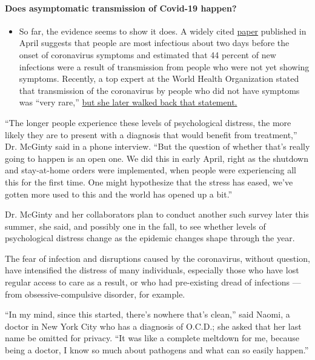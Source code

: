 \begin{itemize}
{  \paragraph{Does asymptomatic transmission of Covid-19
  happen?}\label{does-asymptomatic-transmission-of-covid-19-happen}}

  \begin{itemize}
  \tightlist
  \item
    So far, the evidence seems to show it does. A widely cited
    \href{https://www.nature.com/articles/s41591-020-0869-5}{paper}
    published in April suggests that people are most infectious about
    two days before the onset of coronavirus symptoms and estimated that
    44 percent of new infections were a result of transmission from
    people who were not yet showing symptoms. Recently, a top expert at
    the World Health Organization stated that transmission of the
    coronavirus by people who did not have symptoms was ``very rare,''
    \href{https://www.nytimes.com/2020/06/09/world/coronavirus-updates.html?action=click\&pgtype=Article\&state=default\&region=MAIN_CONTENT_3\&context=storylines_faq\#link-1f302e21}{but
    she later walked back that statement.}
  \end{itemize}
\end{itemize}

``The longer people experience these levels of psychological distress,
the more likely they are to present with a diagnosis that would benefit
from treatment,'' Dr. McGinty said in a phone interview. ``But the
question of whether that's really going to happen is an open one. We did
this in early April, right as the shutdown and stay-at-home orders were
implemented, when people were experiencing all this for the first time.
One might hypothesize that the stress has eased, we've gotten more used
to this and the world has opened up a bit.''

Dr. McGinty and her collaborators plan to conduct another such survey
later this summer, she said, and possibly one in the fall, to see
whether levels of psychological distress change as the epidemic changes
shape through the year.

The fear of infection and disruptions caused by the coronavirus, without
question, have intensified the distress of many individuals, especially
those who have lost regular access to care as a result, or who had
pre-existing dread of infections --- from obsessive-compulsive disorder,
for example.

``In my mind, since this started, there's nowhere that's clean,'' said
Naomi, a doctor in New York City who has a diagnosis of O.C.D.; she
asked that her last name be omitted for privacy. ``It was like a
complete meltdown for me, because being a doctor, I know so much about
pathogens and what can so easily happen.''

